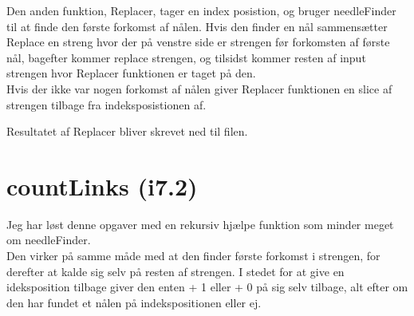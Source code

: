 \documentclass[12pt, a4paper, hidelinks]{article}
\begin{document}
Den anden funktion, Replacer, tager en index posistion, og bruger needleFinder til at finde den første forkomst af nålen. Hvis den finder en nål sammensætter Replace en streng hvor der på venstre side er strengen før forkomsten af første nål, bagefter  kommer replace strengen, og tilsidst kommer resten af input strengen hvor Replacer funktionen er taget på den. \\ 

 Hvis der ikke var nogen forkomst af nålen giver Replacer funktionen en slice af strengen tilbage fra indeksposistionen af.

Resultatet af Replacer bliver skrevet ned til filen. 

\section{ countLinks (i7.2)}

Jeg har løst denne opgaver med en rekursiv hjælpe funktion som minder meget om needleFinder.\\

Den virker på samme måde med at den finder første forkomst i strengen, for derefter at kalde sig selv på resten af strengen. I stedet for at give en ideksposition tilbage giver den enten + 1 eller +  0 på sig selv tilbage, alt efter om den har fundet et nålen på indekspositionen eller ej. 





\end{document}
